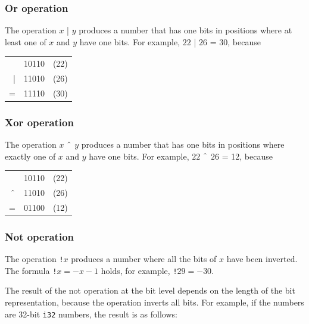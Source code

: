 \subsubsection{Or operation}


The  operation $x$ | $y$ produces a number
that has one bits in positions where at least one
of $x$ and $y$ have one bits.
For example, $22$ | $26$ = 30, because

\begin{center}
\begin{tabular}{rrr}
& 10110 & (22)\\
| & 11010 & (26) \\
\hline
 = & 11110 & (30) \\
\end{tabular}
\end{center}

\subsubsection{Xor operation}


The  operation $x$ $\XOR$ $y$ produces a number
that has one bits in positions where exactly one
of $x$ and $y$ have one bits.
For example, $22$ $\XOR$ $26$ = 12, because

\begin{center}
\begin{tabular}{rrr}
& 10110 & (22)\\
$\XOR$ & 11010 & (26) \\
\hline
 = & 01100 & (12) \\
\end{tabular}
\end{center}

\subsubsection{Not operation}


The  operation \texttt{!}$x$
produces a number where all the bits of $x$
have been inverted.
The formula \texttt{!}$x = -x-1$ holds,
for example, \texttt{!}$29 = -30$.

The result of the not operation at the bit level
depends on the length of the bit representation,
because the operation inverts all bits.
For example, if the numbers are 32-bit
\texttt{i32} numbers, the result is as follows:

